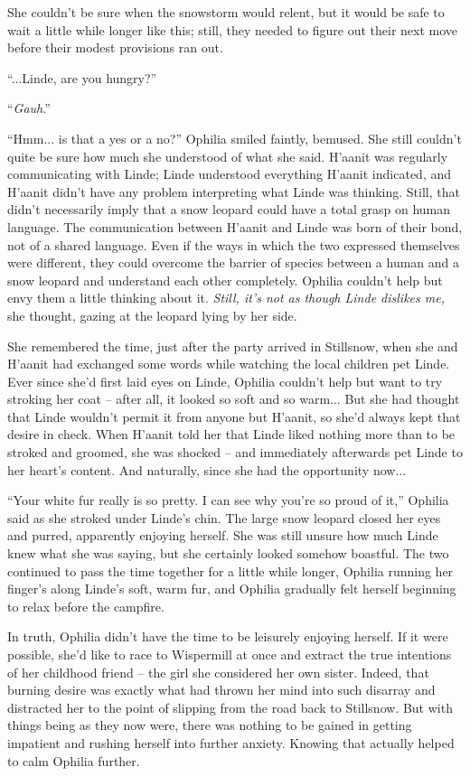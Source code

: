 She couldn't be sure when the snowstorm would relent, but it would be safe to wait a little while longer like this; still, they needed to figure out their next move before their modest provisions ran out.

``...Linde, are you hungry?''

``\emph{Gauh}.''

``Hmm... is that a yes or a no?'' Ophilia smiled faintly, bemused. She still couldn't quite be sure how much she understood of what she said. H'aanit was regularly communicating with Linde; Linde understood everything H'aanit indicated, and H'aanit didn't have any problem interpreting what Linde was thinking. Still, that didn't necessarily imply that a snow leopard could have a total grasp on human language. The communication between H'aanit and Linde was born of their bond, not of a shared language. Even if the ways in which the two expressed themselves were different, they could overcome the barrier of species between a human and a snow leopard and understand each other completely. Ophilia couldn't help but envy them a little thinking about it. \emph{Still, it's not as though Linde dislikes me,} she thought, gazing at the leopard lying by her side.

She remembered the time, just after the party arrived in Stillsnow, when she and H'aanit had exchanged some words while watching the local children pet Linde. Ever since she'd first laid eyes on Linde, Ophilia couldn't help but want to try stroking her coat -- after all, it looked so soft and so warm... But she had thought that Linde wouldn't permit it from anyone but H'aanit, so she'd always kept that desire in check. When H'aanit told her that Linde liked nothing more than to be stroked and groomed, she was shocked -- and immediately afterwards pet Linde to her heart's content. And naturally, since she had the opportunity now...

``Your white fur really is so pretty. I can see why you're so proud of it,'' Ophilia said as she stroked under Linde's chin. The large snow leopard closed her eyes and purred, apparently enjoying herself. She was still unsure how much Linde knew what she was saying, but she certainly looked somehow boastful. The two continued to pass the time together for a little while longer, Ophilia running her finger's along Linde's soft, warm fur, and Ophilia gradually felt herself beginning to relax before the campfire.

In truth, Ophilia didn't have the time to be leisurely enjoying herself. If it were possible, she'd like to race to Wispermill at once and extract the true intentions of her childhood friend -- the girl she considered her own sister. Indeed, that burning desire was exactly what had thrown her mind into such disarray and distracted her to the point of slipping from the road back to Stillsnow. But with things being as they now were, there was nothing to be gained in getting impatient and rushing herself into further anxiety. Knowing that actually helped to calm Ophilia further.

